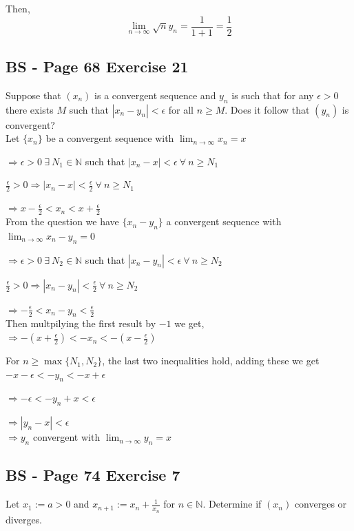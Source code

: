 \documentclass{article}
\begin{document}
Then,
\[
\lim_{n\to\infty}{\sqrt{n}y_n} = \frac{1}{1 + 1} = \frac{1}{2}
\]



\subsection*{BS - Page 68 Exercise 21}
Suppose that \((x_n)\) is a convergent sequence and \(y_n\) is such that for any
\(\epsilon > 0\) there exists \(M\) such that \(|x_n-y_n| < \epsilon\) for all \(n \geq M\).
Does it follow that \((y_n)\) is convergent?
\\


Let \(\{x_n\}\) be a convergent sequence with \(\lim_{n\to\infty}{x_n} = x\)

\(\Rightarrow \epsilon > 0 \ \exists \ N_1 \in \mathbb{N}\) such that \(|x_n - x| < \epsilon \ \forall \ n \geq N_1\)

\(\frac{\epsilon}{2} > 0 \Rightarrow |x_n - x| < \frac{\epsilon}{2} \ \forall \ n \geq N_1\)

\(\Rightarrow x - \frac{\epsilon}{2} < x_n  < x + \frac{\epsilon}{2}\)
\\

From the question we have \(\{x_n- y_n\}\)  a convergent sequence with \(\lim_{n\to\infty}{x_n-y_n} = 0\)

\(\Rightarrow \epsilon > 0 \ \exists \ N_2 \in \mathbb{N}\) such that \(|x_n - y_n | < \epsilon \ \forall \ n \geq N_2\)

\(\frac{\epsilon}{2} > 0 \Rightarrow |x_n - y_n| < \frac{\epsilon}{2} \ \forall \ n \geq N_2\)

\(\Rightarrow  - \frac{\epsilon}{2} < x_n - y_n  < \frac{\epsilon}{2}\)
\\

Then multpilying the first result by \(-1\) we get, \(\Rightarrow -(x + \frac{\epsilon}{2}) < -x_n < -(x - \frac{\epsilon}{2})\)

For \(n \geq \max\{N_1, N_2\}\), the last two inequalities hold, adding these we get \(- x - \epsilon < - y_n < - x+ \epsilon\)

\(\Rightarrow - \epsilon < -y_n + x < \epsilon\)

\(\Rightarrow |y_n - x| < \epsilon\)
\\

\(\Rightarrow y_n\) convergent with \(\lim_{n\to\infty}{y_n} = x\)



\subsection*{BS - Page 74 Exercise 7}
Let \(x_1 := a >0 \) and \(x_{n+1} := x_n + \frac{1}{x_n}\) for \(n \in \mathbb{N}\).
Determine if \((x_n)\) converges or diverges.
\\
\end{document}
